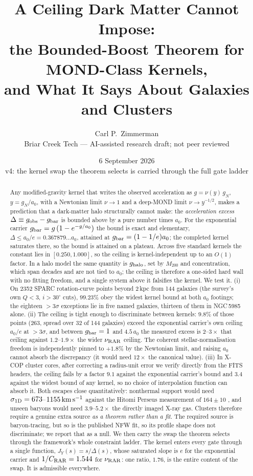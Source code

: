 \documentclass[11pt,letterpaper]{article}
\title{A Ceiling Dark Matter Cannot Impose:\\ the Bounded-Boost Theorem for MOND-Class Kernels,\\ and What It Says About Galaxies and Clusters}
\author{Carl P.\ Zimmerman\\ \small Briar Creek Tech --- AI-assisted research draft; not peer reviewed}
\date{6 September 2026 \\ \small v4: the kernel swap the theorem selects is carried through the full gate ladder}
\begin{document}
\maketitle
\begin{abstract}
Any modified-gravity kernel \cite{milgrom83,bm84,qumond,fm12} that writes the observed acceleration as $g=\nu(y)\,g_N$, $y=g_N/a_0$, with a Newtonian limit $\nu\to1$ and a deep-MOND limit $\nu\to y^{-1/2}$, makes a prediction that a dark-matter halo structurally cannot make: the \emph{acceleration excess} $\Delta \equiv g_{\rm obs}-g_{\rm bar}$ is bounded above by a pure number times $a_0$. For the exponential carrier $g_{\rm bar}=g\,(1-e^{-g/a_0})$ the bound is exact and elementary, $\Delta\le a_0/e=0.367879\ldots a_0$, attained at $g_{\rm bar}=(1-1/e)a_0$; the completed kernel saturates there, so the bound is attained on a plateau. Across five standard kernels the constant lies in $[0.250,1.000]$, so the ceiling is kernel-independent up to an $O(1)$ factor. In a halo model the same quantity is $g_{\rm halo}$, set by $M_{200}$ and concentration, which span decades and are not tied to $a_0$; the ceiling is therefore a one-sided hard wall with no fitting freedom, and a single system above it falsifies the kernel. We test it. (i) On 2352 SPARC \cite{sparc} rotation-curve points beyond 2\,kpc from 144 galaxies (the survey's own $Q<3$, $i>30^\circ$ cuts), $99.23\%$ obey the widest kernel bound at both $a_0$ footings; the eighteen $>3\sigma$ exceptions lie in five named galaxies, thirteen of them in NGC\,5985 alone. (ii) The ceiling is tight enough to discriminate between kernels: $9.8\%$ of those points (263, spread over 32 of 144 galaxies) exceed the exponential carrier's own ceiling $a_0/e$ at $>3\sigma$, and between $g_{\rm bar}=1$ and $4.5\,a_0$ the measured excess is $2$--$3\times$ that ceiling against $1.2$--$1.9\times$ the wider $\nu_{\rm RAR}$ \cite{rar} ceiling. The coherent stellar-normalisation freedom is independently pinned to $+1.8\%$ by the Newtonian limit, and raising $a_0$ cannot absorb the discrepancy (it would need $12\times$ the canonical value). (iii) In X-COP \cite{eckert19,ettori19} cluster cores, after correcting a radius-unit error we verify directly from the FITS headers, the ceiling fails by a factor $9.1$ against the exponential carrier's bound and $3.4$ against the widest bound of any kernel, so no choice of interpolation function can absorb it. Both escapes close quantitatively: nonthermal support would need $\sigma_{\rm 1D}=673$--$1155\,{\rm km\,s^{-1}}$ against the Hitomi Perseus measurement of $164\pm10$ \cite{hitomi}, and unseen baryons would need $3.9$--$5.2\times$ the directly imaged X-ray gas. Clusters therefore require a genuine extra source \emph{as a theorem rather than a fit}. The required source is baryon-tracing, but so is the published NFW \cite{nfw} fit, so its profile shape does not discriminate; we report that as a null. We then carry the swap the theorem selects through the framework's whole constraint ladder. The kernel enters every gate through a single function, $J_Y(s)=s/\Delta(s)$, whose saturated slope is $e$ for the exponential carrier and $1/C_{\rm RAR}=1.544$ for $\nu_{\rm RAR}$: one ratio, $1.76$, is the entire content of the swap. It is admissible everywhere. 
\end{abstract}
\end{document}
